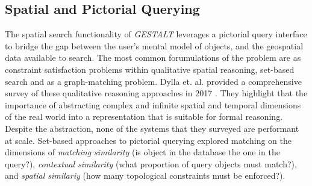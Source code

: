 \subsection{Spatial and Pictorial Querying}
\par{The spatial search functionality of \emph{GESTALT} leverages a pictorial query interface to bridge the gap between the user's mental model of objects, and the geospatial data available to search. 
The most common forumulations of the problem are as constraint satisfaction problems within qualitative spatial reasoning, set-based search and as a graph-matching problem. 
Dylla et. al. provided a comprehensive survey of these qualitative reasoning approaches in 2017 \cite{Dylla2017}. 
They highlight that the importance of abstracting complex and infinite spatial and temporal dimensions of the real world into a representation that is suitable for formal reasoning.
Despite the abstraction, none of the systems that they surveyed are performant at scale. 
Set-based approaches to pictorial querying explored matching on the dimensions of \textit{matching similarity} (is object in the database the one in the query?), \textit{contextual similarity} (what proportion of query objects must match?), and \textit{spatial similariy} (how many topological constraints must be enforced?). 
}
